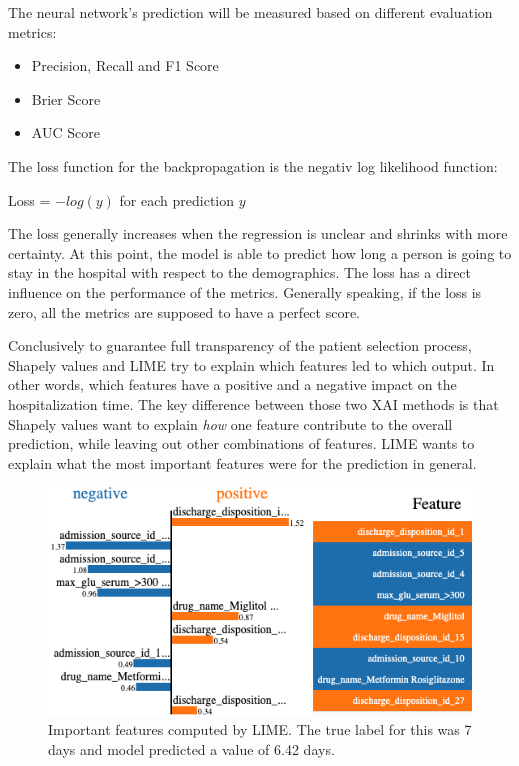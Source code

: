 \documentclass[journal]{IEEEtran}
\begin{document}
The neural network's prediction will be measured based on different evaluation metrics: \\

\begin{itemize}
	\item Precision, Recall and F1 Score
	\item Brier Score
	\item AUC Score \\
\end{itemize}

The loss function for the backpropagation is the negativ log likelihood function: 

\begin{center}
	Loss = \(-log(y)\) for each prediction \(y\) \\
\end{center}

The loss generally increases when the regression is unclear and shrinks with more certainty. At this point, the model is able to predict how long a person is going to stay in the hospital with respect to the demographics. The loss has a direct influence on the performance of the metrics. Generally speaking, if the loss is zero, all the metrics are supposed to have a perfect score.

Conclusively to guarantee full transparency of the patient selection process, Shapely values and LIME try to explain which features led to which output. In other words, which features have a positive and a negative impact on the hospitalization time. The key difference between those two XAI methods is that Shapely values want to explain \textit{how} one feature contribute to the overall prediction, while leaving out other combinations of features. LIME wants to explain what the most important features were for the prediction in general.

\begin{figure}[!b]
	\centering
	\includegraphics[width=1\linewidth]{../imgs/lime_paper}
	\caption{Important features computed by LIME. The true label for this was 7 days and model predicted a value of 6.42 days.}
	\label{fig:lime}
\end{figure}
\end{document}
